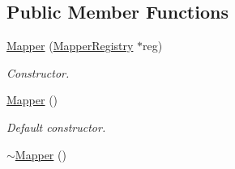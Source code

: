 \subsection*{Public Member Functions}
\begin{DoxyCompactItemize}
\item 
\hyperlink{classMapper_a3ceeb740084ee1ee24164cc5c5c4f253}{Mapper} (\hyperlink{classMapperRegistry}{MapperRegistry} $\ast$reg)
\begin{DoxyCompactList}\small\item\em Constructor. \item\end{DoxyCompactList}\item 
\hypertarget{classMapper_a15fd8e5e4f913d24bb3a2c1371d6426c}{
\hyperlink{classMapper_a15fd8e5e4f913d24bb3a2c1371d6426c}{Mapper} ()}
\label{classMapper_a15fd8e5e4f913d24bb3a2c1371d6426c}

\begin{DoxyCompactList}\small\item\em Default constructor. \item\end{DoxyCompactList}\item 
\hypertarget{classMapper_a24b42bce1e3052a0009181ed283d1070}{
\hyperlink{classMapper_a24b42bce1e3052a0009181ed283d1070}{$\sim$Mapper} ()}
\label{classMapper_a24b42bce1e3052a0009181ed283d1070}


\end{DoxyCompactItemize}
